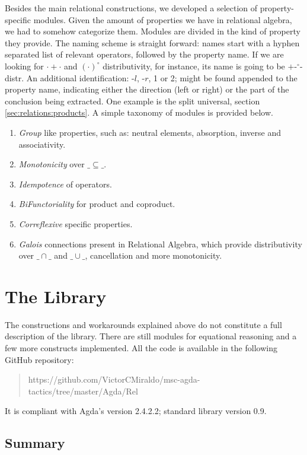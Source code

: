 Besides the main relational constructions, we developed a selection of property-specific modules.
Given the amount of properties we have in relational algebra, we had to somehow categorize them.
Modules are divided in the kind of property they provide. The naming scheme is straight forward:
names start with a hyphen separated list of relevant operators, followed by the property name.
If we are looking for $\cdot + \cdot$ and $(\cdot)^\circ$ distributivity, for instance, 
its name is going to be $+$-$^\circ$-distr. An additional identification: -$l$, -$r$, 1 or 2; might be found
appended to the property name, indicating either the direction (left or right) or the part of 
the conclusion being extracted. One example is the split universal, section \ref{sec:relations:products}.
A simple taxonomy of modules is provided below.

\begin{enumerate}
  \item \emph{Group} like properties, such as: neutral elements, absorption, inverse and associativity.
  \item \emph{Monotonicity} over $\_\subseteq\_$.
  \item \emph{Idempotence} of operators.
  \item \emph{BiFunctoriality} for product and coproduct.
  \item \emph{Correflexive} specific properties.
  \item \emph{Galois} connections present in Relational Algebra, which provide
                distributivity over $\_\cap\_$ and $\_\cup\_$, cancellation and
                more monotonicity.
\end{enumerate}

\section{The Library}

The constructions and workarounds explained above do not constitute a full description of the library.
There are still modules for equational reasoning and a few more constructs implemented.
All the code is available in the following GitHub repository: 
\begin{quote}
\small https://github.com/VictorCMiraldo/msc-agda-tactics/tree/master/Agda/Rel
\end{quote}
It is compliant with Agda's version 2.4.2.2; standard library version 0.9.

\subsection{Summary}

